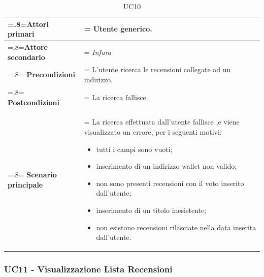             \begin{table}[H]
                \centering
                \renewcommand{\arraystretch}{1.8}
                \renewcommand\tabularxcolumn[1]{m{#1}}
                \begin{tabularx}{0.9\textwidth} {
                    >{\hsize=.8\hsize\linewidth=\hsize}X
                    >{\hsize=1.2\hsize\linewidth=\hsize}X}
                    \hline
                    \textbf{Attori primari} & Utente generico. \\
                    \hline
                    \textbf{Attore secondario} & \textit{Infura} \\
                    \hline
                    \textbf{Precondizioni} & L'utente ricerca le recensioni collegate ad un indirizzo. \\
                    \hline
                    \textbf{Postcondizioni} & La ricerca fallisce. \\
                    \hline
                    \textbf{Scenario principale} & La ricerca effettuata dall'utente fallisce ,e viene visualizzato un errore, per i seguenti motivi:
                    \begin{itemize}
                        \item tutti i campi sono vuoti;
                        \item inserimento di un indirizzo wallet non valido;
                        \item non sono presenti recensioni con il voto inserito dall'utente;
                        \item inserimento di un titolo inesistente;
                        \item non esistono recensioni rilasciate nella data inserita dall'utente.
                    \end{itemize} \\
                    \hline
                \end{tabularx}
                \caption{UC10}
            \end{table}

        \subsubsection{UC11 - Visualizzazione Lista Recensioni}
        \label{UC11}

